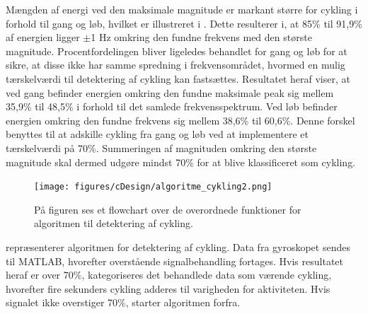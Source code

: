 Mængden af energi ved den maksimale magnitude er markant større for cykling i forhold til gang og løb, hvilket er illustreret i . Dette resulterer i, at 85\% til 91,9\% af energien ligger $\pm$1 Hz omkring den fundne frekvens med den største magnitude. Procentfordelingen bliver ligeledes behandlet for gang og løb for at sikre, at disse ikke har samme spredning i frekvensområdet, hvormed en mulig tærskelværdi til detektering af cykling kan fastsættes. Resultatet heraf viser, at ved gang befinder energien omkring den fundne maksimale peak sig mellem 35,9\% til 48,5\% i forhold til det samlede frekvensspektrum. Ved løb befinder energien omkring den fundne frekvens sig mellem 38,6\% til 60,6\%. Denne forskel benyttes til at adskille cykling fra gang og løb ved at implementere et tærskelværdi på 70\%. Summeringen af magnituden omkring den største magnitude skal dermed udgøre mindst 70\% for at blive klassificeret som cykling. 
\begin{figure}[H]
	\centering
	\texttt{[image: figures/cDesign/algoritme\_cykling2.png]}
	\caption{På figuren ses et flowchart over de overordnede funktioner for algoritmen til detektering af cykling.}
	\label{fig:algoritme_cykling}
\end{figure}\vspace{-0.25cm}
 repræsenterer algoritmen for detektering af cykling. Data fra gyroskopet sendes til MATLAB, hvorefter overstående signalbehandling fortages. Hvis resultatet heraf er over 70\%, kategoriseres det behandlede data som værende cykling, hvorefter fire sekunders cykling adderes til varigheden for aktiviteten. Hvis signalet ikke overstiger 70\%, starter algoritmen forfra.

